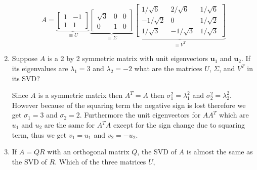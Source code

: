 \begin{enumerate}[label=\arabic*.]
\begin{mdframed}[style=MyFrame]
\begin{equation}
                A = 
                \underbrace{
                    \begin{bmatrix}
                        1       &       -1      \\
                        1       &       1       
                    \end{bmatrix}
                }_{\equiv U}
                \underbrace{
                    \begin{bmatrix}
                        \sqrt{3}        &       0       &       0       \\
                        0               &       1       &       0       
                    \end{bmatrix}
                }_{\equiv \Sigma}
                \underbrace{
                    \begin{bmatrix}
                        1/\sqrt{6}      &       2/\sqrt{6}      &   1/\sqrt{6}          \\
                        -1/\sqrt{2}     &       0               &   1/\sqrt{2}          \\
                        1/\sqrt{3}      &       -1/\sqrt{3}     &   1/\sqrt{3}
                    \end{bmatrix}
                }_{\equiv V^{T}}
            \end{equation}
        \end{mdframed}
    \item Suppose $A$ is a 2 by 2 symmetric matrix with unit eigenvectors
        $\mathbf{u}_{1}$ and $\mathbf{u}_{2}$. If its eigenvalues are
        $\lambda_{1} = 3$ and $\lambda_{2} = -2$ what are the matrices $U$,
        $\Sigma$, and $V^{T}$ in its SVD?
        \begin{mdframed}[style=MyFrame]
            Since $A$ is a symmetric matrix then $A^{T}=A$ then
            $\sigma_{1}^{2} = \lambda_{1}^{2}$ and $\sigma_{2}^{2} =
            \lambda_{2}^{2}$. However because of the squaring term the
            negative sign is lost therefore we get $\sigma_{1}=3$ and
            $\sigma_{2}=2$. Furthermore the unit eigenvectors for $AA^{T}$
            which are $u_{1}$ and $u_{2}$ are the same for $A^{T}A$ except
            for the sign change due to squaring term, thus we get $v_{1} =
            u_{1}$ and $v_{2}=-u_{2}$.   
        \end{mdframed}
    \item If $A=QR$ with an orthogonal matrix $Q$, the SVD of $A$ is almost
        the same as the SVD of $R$. Which of the three matrices $U$,

\end{enumerate}
